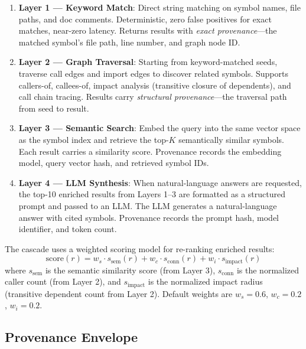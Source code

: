 \documentclass[conference]{IEEEtran}
\begin{document}
\begin{enumerate}
  \item \textbf{Layer 1 --- Keyword Match}: Direct string matching on
    symbol names, file paths, and doc comments. Deterministic, zero
    false positives for exact matches, near-zero latency. Returns
    results with \emph{exact provenance}---the matched symbol's file
    path, line number, and graph node ID.

  \item \textbf{Layer 2 --- Graph Traversal}: Starting from
    keyword-matched seeds, traverse call edges and import edges to
    discover related symbols. Supports callers-of, callees-of,
    impact analysis (transitive closure of dependents), and call chain
    tracing. Results carry \emph{structural provenance}---the
    traversal path from seed to result.

  \item \textbf{Layer 3 --- Semantic Search}: Embed the query into the
    same vector space as the symbol index and retrieve the top-$K$
    semantically similar symbols. Each result carries a similarity
    score. Provenance records the embedding model, query vector hash,
    and retrieved symbol IDs.

  \item \textbf{Layer 4 --- LLM Synthesis}: When natural-language
    answers are requested, the top-10 enriched results from Layers 1--3
    are formatted as a structured prompt and passed to an LLM. The LLM
    generates a natural-language answer with cited symbols. Provenance
    records the prompt hash, model identifier, and token count.
\end{enumerate}

The cascade uses a weighted scoring model for re-ranking enriched
results:
\begin{equation}
  \text{score}(r) = w_s \cdot s_{\text{sem}}(r)
                   + w_c \cdot s_{\text{conn}}(r)
                   + w_i \cdot s_{\text{impact}}(r)
  \label{eq:scoring}
\end{equation}
where $s_{\text{sem}}$ is the semantic similarity score (from Layer 3),
$s_{\text{conn}}$ is the normalized caller count (from Layer 2), and
$s_{\text{impact}}$ is the normalized impact radius (transitive
dependent count from Layer 2). Default weights are
$w_s = 0.6$, $w_c = 0.2$, $w_i = 0.2$.

\subsection{Provenance Envelope}
\label{sec:approach:provenance}
\end{document}
